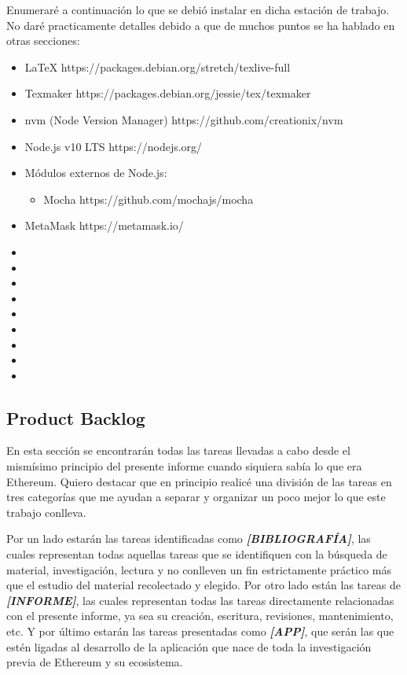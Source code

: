 Enumeraré a continuación lo que se debió instalar en dicha estación de trabajo. No daré
practicamente detalles debido a que de muchos puntos se ha hablado en otras secciones:

\begin{itemize}
\item LaTeX https://packages.debian.org/stretch/texlive-full
\item Texmaker https://packages.debian.org/jessie/tex/texmaker
\item nvm (Node Version Manager) https://github.com/creationix/nvm
\item Node.js v10 LTS https://nodejs.org/
\item Módulos externos de Node.js:
	\begin{itemize}
		\item Mocha https://github.com/mochajs/mocha
	\end{itemize}
\item MetaMask https://metamask.io/
\item 
\item
\item 
\item 
\item 
\item 
\item 
\item 
\item 
\end{itemize}

\subsection{Product Backlog}
En esta sección se encontrarán todas las tareas llevadas a cabo desde el mismísimo principio del
presente informe cuando siquiera sabía lo que era Ethereum. Quiero destacar que en principio 
realicé una división de las tareas en tres categorías que me ayudan a separar y organizar un poco
mejor lo que este trabajo conlleva. 

Por un lado estarán las tareas identificadas como \textbf{\textit{[BIBLIOGRAFÍA]}}, las cuales 
representan todas aquellas tareas que se identifiquen con la búsqueda de material, investigación,
lectura y no conlleven un fin estrictamente práctico más que el estudio del material recolectado y
elegido. Por otro lado están las tareas de \textbf{\textit{[INFORME]}}, las cuales representan 
todas las tareas directamente relacionadas con el presente informe, ya sea su creación, escritura, 
revisiones, mantenimiento, etc. Y por último estarán las tareas presentadas como 
\textbf{\textit{[APP]}}, que serán las que estén ligadas al desarrollo de la aplicación que nace
de toda la investigación previa de Ethereum y su ecosistema.

